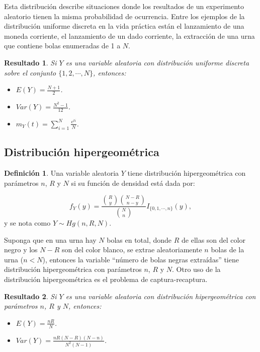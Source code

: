 \documentclass[
  10pt,
  spanish,
]{book}
\providecommand{\tightlist}{%
  \setlength{\itemsep}{0pt}\setlength{\parskip}{0pt}}
\newtheorem{proposition}{Resultado}[chapter]
\theoremstyle{definition}
\newtheorem{definition}{Definición}[chapter]
\theoremstyle{definition}
\theoremstyle{definition}
\theoremstyle{definition}
\theoremstyle{remark}
\begin{document}
Esta distribución describe situaciones donde los resultados de un experimento aleatorio tienen la misma probabilidad de ocurrencia. Entre los ejemplos de la distribución uniforme discreta en la vida práctica están el lanzamiento de una moneda corriente, el lanzamiento de un dado corriente, la extracción de una urna que contiene bolas enumeradas de 1 a \(N\).

\begin{proposition}
\protect\hypertarget{prp:unnamed-chunk-2}{}{\label{prp:unnamed-chunk-2} }Si \(Y\) es una variable aleatoria con distribución uniforme discreta sobre el conjunto \(\{1,2,\cdots,N\}\), entonces:

\begin{itemize}
\tightlist
\item
  \(E(Y)=\frac{N+1}{2}\).
\item
  \(Var(Y)=\frac{N^2-1}{12}\).
\item
  \(m_Y(t)=\sum_{i=1}^N\frac{e^{ti}}{N}\).
\end{itemize}
\end{proposition}

\hypertarget{distribuciuxf3n-hipergeomuxe9trica}{%
\subsection{Distribución hipergeométrica}\label{distribuciuxf3n-hipergeomuxe9trica}}

\begin{definition}
\protect\hypertarget{def:unnamed-chunk-3}{}{\label{def:unnamed-chunk-3} }Una variable aleatoria \(Y\) tiene distribución hipergeométrica con parámetros \(n\), \(R\) y \(N\) si su función de densidad está dada por:

\begin{equation}
f_Y(y)=\frac{\binom{R}{y}\binom{N-R}{n-y}}{\binom{N}{n}}I_{\{0,1,\cdots,n\}}(y),
\end{equation}
y se nota como \(Y\sim Hg(n,R,N)\).
\end{definition}

Suponga que en una urna hay \(N\) bolas en total, donde \(R\) de ellas son del color negro y los \(N-R\) son del color blanco, se extrae aleatoriamente
\(n\) bolas de la urna (\(n<N\)), entonces la variable ``número de bolas negras extraídas'' tiene distribución hipergeométrica con parámetros \(n\), \(R\) y
\(N\). Otro uso de la distribución hipergeométrica es el problema de captura-recaptura.

\begin{proposition}
\protect\hypertarget{prp:unnamed-chunk-4}{}{\label{prp:unnamed-chunk-4} }Si \(Y\) es una variable aleatoria con distribución hipergeométrica con parámetros \(n\), \(R\) y \(N\), entonces:

\begin{itemize}
\tightlist
\item
  \(E(Y)=\frac{nR}{N}\).
\item
  \(Var(Y)=\frac{nR(N-R)(N-n)}{N^2(N-1)}\).
\end{itemize}
\end{proposition}
\end{document}
